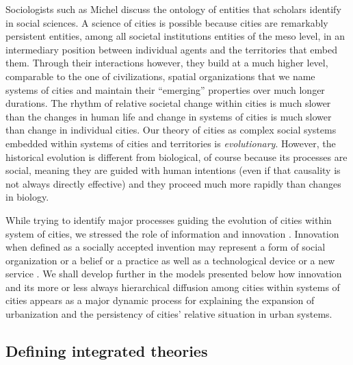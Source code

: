 \documentclass[10pt,letterpaper]{article}
\begin{document}
Sociologists such as Michel \cite{grossetti2020matiere} discuss the ontology of entities that scholars identify in social sciences. A science of cities is possible because cities are remarkably persistent entities, among all societal institutions entities of the meso level, in an intermediary position between individual agents and the territories that embed them. Through their interactions however, they build at a much higher level, comparable to the one of civilizations, spatial organizations that we name systems of cities and maintain their ``emerging'' properties over much longer durations. The rhythm of relative societal change within cities is much slower than the changes in human life and change in systems of cities is much slower than change in individual cities. Our theory of cities as complex social systems embedded within systems of cities and territories is \emph{evolutionary}. However, the historical evolution is different from biological, of course because its processes are social, meaning they are guided with human intentions (even if that causality is not always directly effective) and they proceed much more rapidly than changes in biology.

While trying to identify major processes guiding the evolution of cities within system of cities, we stressed the role of information and innovation \citep{lane2009complexity}. Innovation when defined as a socially accepted invention may represent a form of social organization or a belief or a practice as well as a technological device or a new service \citep{broitman2020endogenous}. We shall develop further in the models presented below how innovation and its more or less always hierarchical diffusion among cities within systems of cities appears as a major dynamic process for explaining the expansion of urbanization and the persistency of cities’ relative situation in urban systems.


\subsection{Defining integrated theories}
\end{document}
